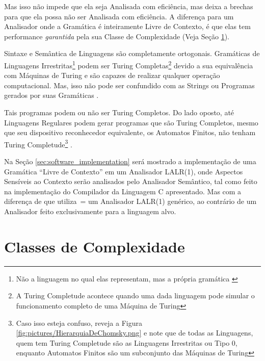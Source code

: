{    Mas isso não impede que ela seja Analisada com eficiência,
    mas deixa a brechas para que ela possa não ser Analisada com eficiência.
    A diferença para um Analisador onde a Gramática é inteiramente Livre de Contexto,
    é que elas tem performance \textit{garantida} pela sua Classe de Complexidade (Veja Seção \ref{classesDeComplexidade}).

    Sintaxe e
    Semântica de Linguagens são completamente ortogonais.
    Gramáticas de Linguagens Irrestritas\footnote{
    Não a linguagem no qual elas representam,
    mas a própria gramática \cite{finiteAutomataTuringComplete}
    } podem ser Turing Completas\footnote{
    A Turing Completude acontece quando uma dada linguagem pode simular o funcionamento completo de uma Máquina de Turing } devido a sua equivalência com Máquinas de Turing e
    são capazes de realizar qualquer operação computacional.
    Mas,
    isso não pode ser confundido com as Strings ou
    Programas gerados por suas Gramáticas \cite{areThereDomainSpecificLanguages}.

    Tais programas podem ou
    não ser Turing Completos.
    Do lado oposto,
    até Linguagens Regulares podem gerar programas que são Turing Completos,
    mesmo que seu dispositivo reconhecedor equivalente,
    os Automatos Finitos,
    não tenham Turing Completude\footnote{
    Caso isso esteja confuso,
    reveja a Figura \ref{fig:pictures/HierarquiaDeChomsky.png} e
    note que de todas as Linguagens,
    quem tem Turing Completude são as Linguagens Irrestritas ou
    Tipo 0,
    enquanto Automatos Finitos são um subconjunto das Máquinas de Turing } \cite{turingCompleteRegularLanguages,finiteAutomataTuringComplete}.

    Na Seção \ref{sec:software_implementation} será mostrado a implementação de uma Gramática ``Livre de Contexto'' em um Analisador LALR(1),
    onde Aspectos Sensíveis ao Contexto serão analisados pelo Analisador Semântico,
    tal como feito na implementação do Compilador da Linguagem C apresentado.
    Mas com a diferença de que utiliza~= um Analisador LALR(1) genérico,
    ao contrário de um Analisador feito exclusivamente para a linguagem alvo.


\section{Classes de Complexidade}
\label{classesDeComplexidade}

}
